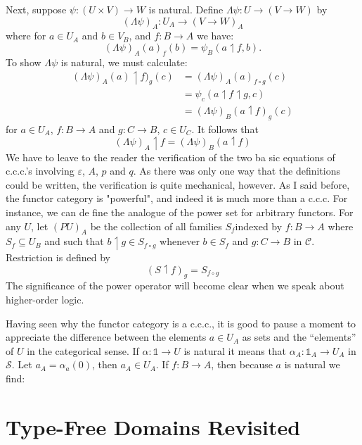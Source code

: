\documentclass[12pt]{article}
\def\to{\rightarrow}
\def\res{\!\upharpoonleft\!}
\def\comp{\circ}
\def\bbone{\mathbb 1}
\def\ccc{{c.c.c.}}
\def\ev{\varepsilon}
\def\L{\Lambda}
\def\C{\mathcal C}
\def\S{\mathcal S}
\begin{document}
Next, suppose $\psi: (U \times V) \to W$ is natural. Define
$\L \psi  : U\to (V\to W)$ by
%
$$
(\L \psi)_A: U_A \to (V \to W)_A
$$
%
where for $a \in U_A$ and $b \in V_B$, and $f: B \to A$ we have:
$$
(\L \psi)_A (a)_f (b) = \psi_B (a \res f, b).
$$
To show $\L\psi$ is natural, we must calculate:
\begin{align*}
(\L \psi)_A (a)\res f)_g (c) &= (\L \psi)_A(a)_{f \comp g} (c)\\
&= \psi_c(a \res f \res g,c)\\
&= (\L \psi)_B(a \res f)_g (c)
\end{align*}
%
for $a \in U_A$, $f : B \to A$ and $g: C\to B$, $c \in U_C$. It follows that
$$
(\L \psi)_A \res f = (\L \psi)_B (a \res f)
$$
%
We have to leave to the reader the verification of the two ba­
sic equations of \ccc's involving $\ev$, $A$, $p$ and $q$. As there was only one way that the definitions could be written, the verification is quite mechanical, however.
As I said before, the functor category is "powerful", and indeed it is much more than a c.c.c. For instance, we can de­ fine the analogue of the power set for arbitrary functors. For any $U$, let $(PU)_A$ be the collection of all families $S_f $indexed by $f: B\to A$ where $S_f \subseteq U_B$ and such that $b\res g \in S_{f \comp g}$ whenever $b\in S_f$ and $g: C\to B$ in $\C$. Restriction is defined by
$$
(S \res f)_g = S_{f \comp g}
$$
%
The significance of the power operator will become clear when we speak about higher-order logic.

Having seen why the functor category is a \ccc, it is good to pause a moment to appreciate the difference between the ele­ments $a \in U_A$ as sets and the ``elements'' of $U$ in the categorical sense. If $\alpha : \bbone \to U$ is natural it means that $\alpha_A  : \bbone_A  \to U_A$ in $\S$. Let $a_A = \alpha_a(0)$, then $a_A \in U_A$. If $f:B\to A$, then because $a$ is natural we find:

\section{Type-Free Domains Revisited}

\begin{thebibliography}{86}
\end{thebibliography}
\end{document}
